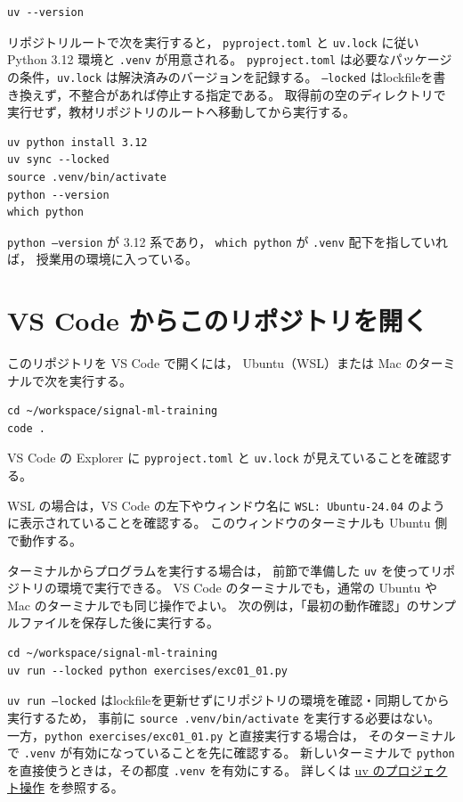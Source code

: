 \begin{lstlisting}[style=codecell]
uv --version
\end{lstlisting}

リポジトリルートで次を実行すると，
\texttt{pyproject.toml} と \texttt{uv.lock} に従い
Python 3.12 環境と \texttt{.venv} が用意される。
\texttt{pyproject.toml} は必要なパッケージの条件，\texttt{uv.lock} は解決済みのバージョンを記録する。
\texttt{--locked} はlockfileを書き換えず，不整合があれば停止する指定である。
取得前の空のディレクトリで実行せず，教材リポジトリのルートへ移動してから実行する。

\begin{lstlisting}[style=codecell]
uv python install 3.12
uv sync --locked
source .venv/bin/activate
python --version
which python
\end{lstlisting}

\texttt{python --version} が 3.12 系であり，
\texttt{which python} が \texttt{.venv} 配下を指していれば，
授業用の環境に入っている。

\section{VS Code からこのリポジトリを開く}

このリポジトリを VS Code で開くには，
Ubuntu（WSL）または Mac のターミナルで次を実行する。

\begin{lstlisting}[style=codecell]
cd ~/workspace/signal-ml-training
code .
\end{lstlisting}

VS Code の Explorer に \texttt{pyproject.toml} と \texttt{uv.lock} が見えていることを確認する。

WSL の場合は，VS Code の左下やウィンドウ名に
\texttt{WSL: Ubuntu-24.04} のように表示されていることを確認する。
このウィンドウのターミナルも Ubuntu 側で動作する。

ターミナルからプログラムを実行する場合は，
前節で準備した \texttt{uv} を使ってリポジトリの環境で実行できる。
VS Code のターミナルでも，通常の Ubuntu や Mac のターミナルでも同じ操作でよい。
次の例は，「最初の動作確認」のサンプルファイルを保存した後に実行する。

\begin{lstlisting}[style=codecell]
cd ~/workspace/signal-ml-training
uv run --locked python exercises/exc01_01.py
\end{lstlisting}

\texttt{uv run --locked} はlockfileを更新せずにリポジトリの環境を確認・同期してから実行するため，
事前に \texttt{source .venv/bin/activate} を実行する必要はない。
一方，\texttt{python exercises/exc01\_01.py} と直接実行する場合は，
そのターミナルで \texttt{.venv} が有効になっていることを先に確認する。
新しいターミナルで \texttt{python} を直接使うときは，その都度 \texttt{.venv} を有効にする。
詳しくは \href{https://docs.astral.sh/uv/guides/projects/}{uv のプロジェクト操作} を参照する。

